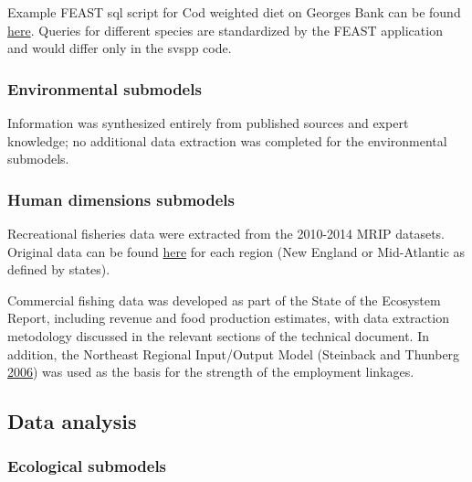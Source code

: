 \documentclass[
]{book}
\begin{document}
Example FEAST sql script for Cod weighted diet on Georges Bank can be found \href{https://github.com/NOAA-EDAB/tech-doc/tree/master/R/stored_scripts/conceptual_models_extraction.sql}{here}.
Queries for different species are standardized by the FEAST application and would differ only in the svspp code.

\hypertarget{environmental-submodels-1}{%
\subsubsection{Environmental submodels}\label{environmental-submodels-1}}

Information was synthesized entirely from published sources and expert knowledge; no additional data extraction was completed for the environmental submodels.

\hypertarget{human-dimensions-submodels-1}{%
\subsubsection{Human dimensions submodels}\label{human-dimensions-submodels-1}}

Recreational fisheries data were extracted from the 2010-2014 MRIP datasets. Original data can be found \href{data/top10_prim1_common_mode.xlsx}{here} for each region (New England or Mid-Atlantic as defined by states).

Commercial fishing data was developed as part of the State of the Ecosystem Report, including revenue and food production estimates, with data extraction metodology discussed in the relevant sections of the technical document. In addition, the Northeast Regional Input/Output Model (Steinback and Thunberg \protect\hyperlink{ref-steinback_scott_northeast_2006}{2006}) was used as the basis for the strength of the employment linkages.

\hypertarget{data-analysis-11}{%
\subsection{Data analysis}\label{data-analysis-11}}

\hypertarget{ecological-submodels-2}{%
\subsubsection{Ecological submodels}\label{ecological-submodels-2}}
\end{document}
